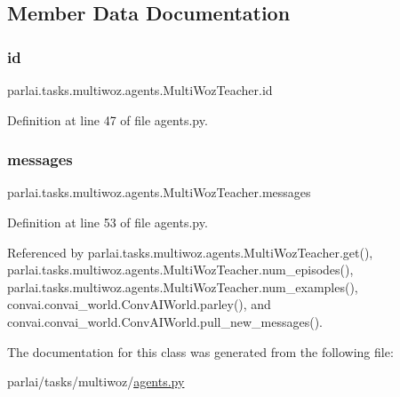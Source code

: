 \subsection{Member Data Documentation}
\mbox{\label{classparlai_1_1tasks_1_1multiwoz_1_1agents_1_1MultiWozTeacher_a8e59cea446db2909435c9bac275e2539}} 
\subsubsection{\texorpdfstring{id}{id}}
{\footnotesize\ttfamily parlai.\+tasks.\+multiwoz.\+agents.\+Multi\+Woz\+Teacher.\+id}



Definition at line 47 of file agents.\+py.

\mbox{\label{classparlai_1_1tasks_1_1multiwoz_1_1agents_1_1MultiWozTeacher_a40d3917ab5dadef1f822ac3c1d06c915}} 
\subsubsection{\texorpdfstring{messages}{messages}}
{\footnotesize\ttfamily parlai.\+tasks.\+multiwoz.\+agents.\+Multi\+Woz\+Teacher.\+messages}



Definition at line 53 of file agents.\+py.



Referenced by parlai.\+tasks.\+multiwoz.\+agents.\+Multi\+Woz\+Teacher.\+get(), parlai.\+tasks.\+multiwoz.\+agents.\+Multi\+Woz\+Teacher.\+num\+\_\+episodes(), parlai.\+tasks.\+multiwoz.\+agents.\+Multi\+Woz\+Teacher.\+num\+\_\+examples(), convai.\+convai\+\_\+world.\+Conv\+A\+I\+World.\+parley(), and convai.\+convai\+\_\+world.\+Conv\+A\+I\+World.\+pull\+\_\+new\+\_\+messages().



The documentation for this class was generated from the following file\+:\begin{DoxyCompactItemize}
\item 
parlai/tasks/multiwoz/\hyperlink{parlai_2tasks_2multiwoz_2agents_8py}{agents.\+py}\end{DoxyCompactItemize}

